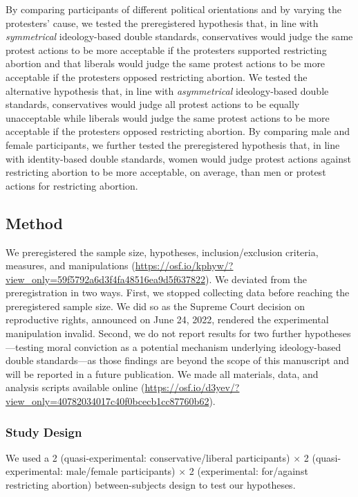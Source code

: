 \documentclass[twocolumn, 11pt, letterpaper]{article}
\begin{document}
By comparing participants of different political orientations and by
varying the protesters' cause, we tested the preregistered hypothesis
that, in line with \emph{symmetrical} ideology-based double standards,
conservatives would judge the same protest actions to be more acceptable
if the protesters supported restricting abortion and that liberals would
judge the same protest actions to be more acceptable if the protesters
opposed restricting abortion. We tested the alternative hypothesis that,
in line with \emph{asymmetrical} ideology-based double standards,
conservatives would judge all protest actions to be equally unacceptable
while liberals would judge the same protest actions to be more
acceptable if the protesters opposed restricting abortion. By comparing
male and female participants, we further tested the preregistered
hypothesis that, in line with identity-based double standards, women
would judge protest actions against restricting abortion to be more
acceptable, on average, than men or protest actions for restricting
abortion.

\hypertarget{method-2}{%
\subsection{Method}\label{method-2}}

We preregistered the sample size, hypotheses, inclusion/exclusion
criteria, measures, and manipulations
(\url{https://osf.io/kphyw/?view_only=59f5792a6d3f4fa48516ea9d5f637822}).
We deviated from the preregistration in two ways. First, we stopped
collecting data before reaching the preregistered sample size. We did so
as the Supreme Court decision on reproductive rights, announced on June
24, 2022, rendered the experimental manipulation invalid. Second, we do
not report results for two further hypotheses---testing moral conviction
as a potential mechanism underlying ideology-based double standards---as
those findings are beyond the scope of this manuscript and will be
reported in a future publication. We made all materials, data, and
analysis scripts available online
(\url{https://osf.io/d3yev/?view_only=40782034017c40f0bcecb1cc87760b62}).

\hypertarget{study-design-2}{%
\subsubsection{Study Design}\label{study-design-2}}

We used a 2 (quasi-experimental: conservative/liberal participants)
\(\times\) 2 (quasi-experimental: male/female participants) \(\times\) 2
(experimental: for/against restricting abortion) between-subjects design
to test our hypotheses.
\end{document}
